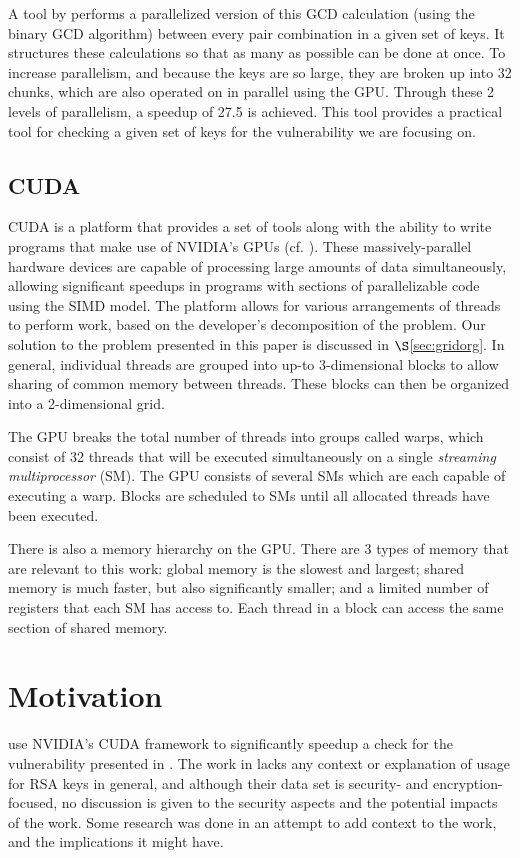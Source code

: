 \documentclass[smallextended]{svjour3}       %
\begin{document}
A tool by \cite{scharfglass2012breaking} performs a
parallelized version of this GCD calculation (using the binary GCD algorithm)
between every pair combination in a given set of keys. It structures these
calculations so that as many as possible can be done at once. To increase
parallelism, and because the keys are so large, they are broken up into 32
chunks, which are also operated on in parallel using the GPU. Through these 2
levels of parallelism, a speedup of 27.5 is achieved. This tool provides a
practical tool for checking a given set of keys for the vulnerability we are
focusing on.

\subsection{CUDA}
\label{subsec:cuda}
CUDA is a platform that provides a set of tools along with the ability to 
write programs that make use of NVIDIA's GPUs (cf. 
\cite{nvidia2012programming}). These massively-parallel hardware devices are 
capable of processing large amounts of data simultaneously, allowing 
significant speedups in programs with sections of parallelizable code using 
the SIMD model. The platform allows for various arrangements of threads to 
perform work, based on the developer's decomposition of the problem. Our 
solution to the problem presented in this paper is discussed in 
$\S$\ref{sec:gridorg}. In general, individual threads are grouped into up-to 
3-dimensional blocks to allow sharing of common memory between threads. These 
blocks can then be organized into a 2-dimensional grid. 

The GPU breaks the total number of threads into groups called warps, which 
consist of 32 threads that will be executed simultaneously on a single
\textit{streaming multiprocessor} (SM). The GPU consists of several SMs which 
are each capable of executing a warp. Blocks are scheduled to SMs until all 
allocated threads have been executed. 

There is also a memory hierarchy on the GPU. There are 3 types of memory 
that are relevant to this work: global memory is the slowest and 
largest; shared memory is much faster, but also significantly smaller; and 
a limited number of registers that each SM has access to. Each thread in a
block can access the same section of shared memory.


\section{Motivation}
\label{sec:motivation}
\cite{scharfglass2012breaking} use NVIDIA's CUDA framework to significantly
speedup a check for the vulnerability presented in \cite{lenstra2012ron}. The
work in \cite{scharfglass2012breaking} lacks any context or explanation of
usage for RSA keys in general, and although their data set is security- and
encryption-focused, no discussion is given to the security aspects and the
potential impacts of the work. Some research was done in an attempt to add
context to the work, and the implications it might have.
\end{document}
